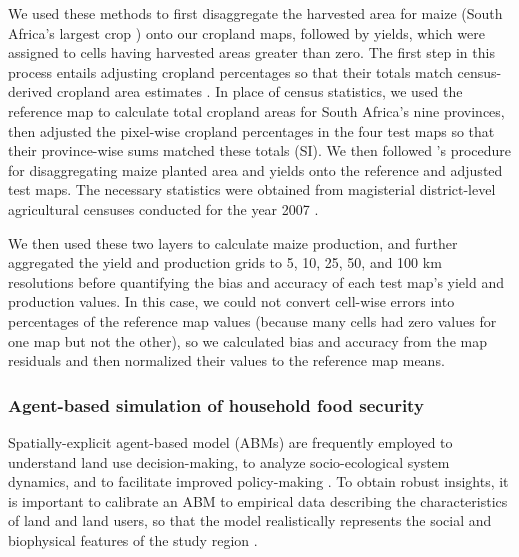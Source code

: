 \documentclass[a4paper]{article}
\newcommand{\citetapos}[1]{\citeauthor{#1}'s \citeyearpar{#1}}
\begin{document}
We used these methods to first disaggregate the harvested area for maize (South Africa's largest crop \citep{estes_projected_2013}) onto our cropland maps, followed by yields, which were assigned to cells having harvested areas greater than zero. The first step in this process entails adjusting cropland percentages so that their totals match census-derived cropland area estimates \citep{ramankutty_farming_2008}. In place of census statistics, we used the reference map to calculate total cropland areas for South Africa's nine provinces, then adjusted the pixel-wise cropland percentages in the four test maps so that their province-wise sums matched these totals (SI). We then followed \citetapos{monfreda_farming_2008} procedure for disaggregating maize \citep[South Africa's largest crop;][]{estes_comparing_2013} planted area and yields onto the reference and adjusted test maps. The necessary statistics were obtained from magisterial district-level agricultural censuses conducted for the year 2007 \citep{statistics_south_africa_commercial_2007}. 

We then used these two layers to calculate maize production, and further aggregated the yield and production grids to 5, 10, 25, 50, and 100 km resolutions before quantifying the bias and accuracy of each test map's yield and production values. In this case, we could not convert cell-wise errors into percentages of the reference map values (because many cells had zero values for one map but not the other), so we calculated bias and accuracy from the map residuals and then normalized their values to the reference map means. 


\vspace{-0.3 cm}
\subsubsection*{Agent-based simulation of household food security }
\vspace{-0.2 cm}
Spatially-explicit agent-based model (ABMs) are frequently employed to understand land use decision-making, to analyze socio-ecological system dynamics, and to facilitate improved policy-making \citep{berger_creating_2006}. To obtain robust insights, it is important to calibrate an ABM to empirical data describing the characteristics of land and land users, so that the model realistically represents the social and biophysical features of the study region \citep{berger_creating_2006}. 
\end{document}
